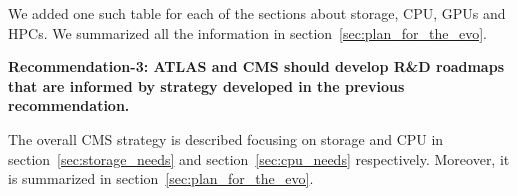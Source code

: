 \documentclass{cmspaper}
\newcommand{\B}[1]{\textbf{#1}}
\begin{document}
We added one such table for each of the sections about storage, CPU, GPUs and HPCs. We summarized all the information in section~\ref{sec:plan_for_the_evo}.

\B{Recommendation-3: ATLAS and CMS should develop R\&D roadmaps that are informed by strategy developed in the previous recommendation.}

The overall CMS strategy is described focusing on storage and CPU in section~\ref{sec:storage_needs} and section~\ref{sec:cpu_needs} respectively. Moreover, it is summarized in section~\ref{sec:plan_for_the_evo}.



\newpage
\printbibliography
\end{document}

